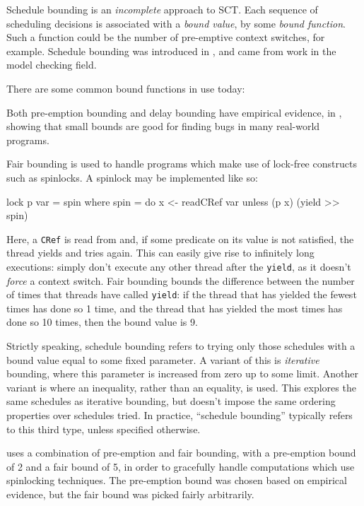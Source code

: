 Schedule bounding is an \emph{incomplete} approach to SCT. Each
sequence of scheduling decisions is associated with a \emph{bound
  value}, by some \emph{bound function}. Such a function could be the
number of pre-emptive context switches, for example. Schedule bounding
was introduced in \citep{pbound}, and came from work in the model
checking field.

There are some common bound functions in use today:




Both pre-emption bounding and delay bounding have empirical evidence,
in \citep{empirical}, showing that small bounds are good for finding
bugs in many real-world programs.

Fair bounding is used to handle programs which make use of lock-free
constructs such as spinlocks. A spinlock may be implemented like so:

\begin{haskellcode}
lock p var = spin where
  spin = do
    x <- readCRef var
    unless (p x) (yield >> spin)
\end{haskellcode}

Here, a \verb|CRef| is read from and, if some predicate on its value
is not satisfied, the thread yields and tries again. This can easily
give rise to infinitely long executions: simply don't execute any
other thread after the \verb|yield|, as it doesn't \emph{force} a
context switch. Fair bounding bounds the difference between the number
of times that threads have called \verb|yield|: if the thread that has
yielded the fewest times has done so 1 time, and the thread that has
yielded the most times has done so 10 times, then the bound value is
9.

Strictly speaking, schedule bounding refers to trying only those
schedules with a bound value equal to some fixed parameter. A variant
of this is \emph{iterative} bounding, where this parameter is
increased from zero up to some limit. Another variant is where an
inequality, rather than an equality, is used. This explores the same
schedules as iterative bounding, but doesn't impose the same ordering
properties over schedules tried. In practice, ``schedule bounding''
typically refers to this third type, unless specified otherwise.

\dejafu{} uses a combination of pre-emption and fair bounding, with a
pre-emption bound of 2 and a fair bound of 5, in order to gracefully
handle computations which use spinlocking techniques. The pre-emption
bound was chosen based on empirical evidence, but the fair bound was
picked fairly arbitrarily.
